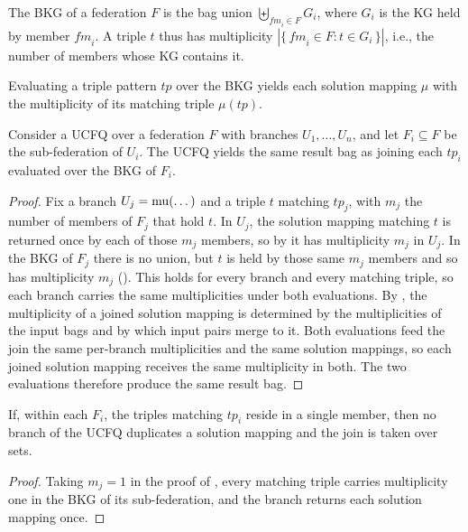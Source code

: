 \documentclass[../main]{subfiles}
\begin{document}
\begin{definition}\label{def_bkg}
The \ac{BKG} of a federation $F$ is the bag union $\biguplus_{\mathit{fm}_i \in F} G_i$, where $G_i$ is the \ac{KG} held by member $\mathit{fm}_i$.
A triple $t$ thus has multiplicity $|\{\, \mathit{fm}_i \in F : t \in G_i \,\}|$, i.e., the number of members whose \ac{KG} contains it.
\end{definition}

Evaluating a triple pattern $\mathit{tp}$ over the \ac{BKG} yields each solution mapping $\mu$ with the multiplicity of its matching triple $\mu(\mathit{tp})$.


\begin{proposition}\label{prop_duplicate_fed_mem}
Consider a \ac{UCFQ} over a federation $F$ with branches $U_1, \dots, U_n$, and let $F_i \subseteq F$ be the sub-federation of $U_i$.
The \ac{UCFQ} yields the same result bag as joining each $\mathit{tp}_i$ evaluated over the \ac{BKG} of $F_i$.
\end{proposition}

\begin{proof}
Fix a branch $U_j = \operatorname{mu}(\dots)$ and a triple $t$ matching $\mathit{tp}_j$, with $m_j$ the number of members of $F_j$ that hold $t$.
In $U_j$, the solution mapping matching $t$ is returned once by each of those $m_j$ members, so by  it has multiplicity $m_j$ in $U_j$.
In the \ac{BKG} of $F_j$ there is no union, but $t$ is held by those same $m_j$ members and so has multiplicity $m_j$ ().
This holds for every branch and every matching triple, so each branch carries the same multiplicities under both evaluations.
By , the multiplicity of a joined solution mapping is determined by the multiplicities of the input bags and by which input pairs merge to it.
Both evaluations feed the join the same per-branch multiplicities and the same solution mappings, so each joined solution mapping receives the same multiplicity in both.
The two evaluations therefore produce the same result bag.
\end{proof}

\begin{corollary}\label{cor_no_overlap}
If, within each $F_i$, the triples matching $\mathit{tp}_i$ reside in a single member, then no branch of the \ac{UCFQ} duplicates a solution mapping and the join is taken over sets.
\end{corollary}

\begin{proof}
Taking $m_j = 1$ in the proof of , every matching triple carries multiplicity one in the \ac{BKG} of its sub-federation, and the branch returns each solution mapping once.
\end{proof}
\end{document}
